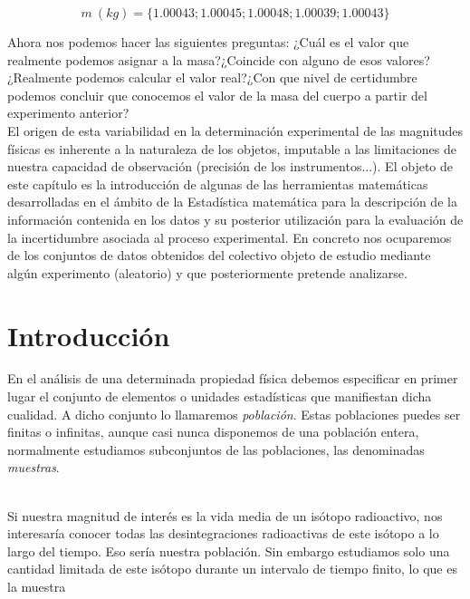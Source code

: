 \documentclass[12pt,a4paper]{book}
\begin{document}
$$ m \ (kg)  = \{1.00043; 1.00045; 1.00048; 1.00039; 1.00043 \} $$

Ahora nos podemos hacer las siguientes preguntas: ¿Cuál es el valor que realmente podemos asignar a la masa?¿Coincide con alguno de esos valores?¿Realmente podemos calcular el valor real?¿Con que nivel de certidumbre podemos concluir que conocemos el valor de la masa del cuerpo a partir del experimento anterior? \\

El origen de esta variabilidad en la determinación experimental de las magnitudes físicas es inherente a la naturaleza de los objetos, imputable a las limitaciones de nuestra capacidad de observación (precisión de los instrumentos...). El objeto de este capítulo es la introducción de algunas de las herramientas matemáticas desarrolladas en el ámbito de la Estadística matemática para la descripción de la información contenida en los datos y su posterior utilización para la evaluación de la incertidumbre asociada al proceso experimental. En concreto nos ocuparemos de los conjuntos de datos obtenidos del colectivo objeto de estudio mediante algún experimento (aleatorio) y que posteriormente pretende analizarse. 

\newpage 

\section{Introducción}

En el análisis de una determinada propiedad física debemos especificar en primer lugar el conjunto de elementos o unidades estadísticas que manifiestan dicha cualidad. A dicho conjunto lo llamaremos \textit{población}.  Estas poblaciones puedes ser finitas o infinitas, aunque casi nunca disponemos de una población entera, normalmente estudiamos subconjuntos de las poblaciones, las denominadas \textit{muestras}. \\ \\


\hrulefill

Si nuestra magnitud de interés es la vida media de un isótopo radioactivo, nos interesaría conocer todas las desintegraciones radioactivas de este isótopo a lo largo del tiempo. Eso sería nuestra población. Sin embargo estudiamos solo una cantidad limitada de este isótopo durante un intervalo de tiempo finito, lo que es la muestra

\hrulefill \\
\end{document}
